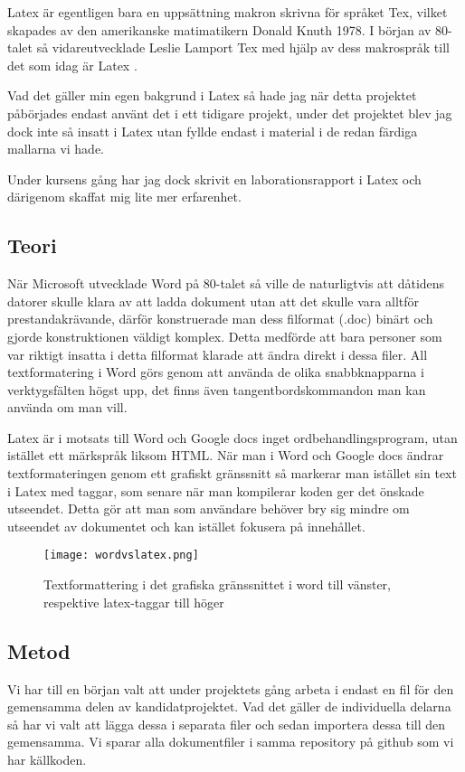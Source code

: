 Latex är egentligen bara en uppsättning makron skrivna för språket Tex, vilket skapades av den amerikanske matimatikern Donald Knuth 1978\cite{donald_knuth}. I början av 80-talet så vidareutvecklade Leslie Lamport Tex med hjälp av dess makrospråk till det som 
idag är Latex \cite{leslie_lamport}.

Vad det gäller min egen bakgrund i Latex så hade jag när detta projektet påbörjades endast använt det i ett tidigare projekt, under det projektet
blev jag dock inte så insatt i Latex utan fyllde endast i material i de redan färdiga mallarna vi hade.

Under kursens gång har jag dock skrivit en laborationsrapport i Latex och därigenom skaffat mig lite mer erfarenhet.


\subsection{Teori}
När Microsoft utvecklade Word på 80-talet så ville de naturligtvis att dåtidens datorer skulle klara av att ladda 
dokument utan att det skulle vara alltför prestandakrävande, därför konstruerade man dess filformat (.doc) binärt och gjorde konstruktionen 
väldigt komplex. Detta medförde att bara personer som var riktigt insatta i detta filformat klarade att ändra direkt i dessa filer.
All textformatering i Word görs genom att använda de olika snabbknapparna i verktygsfälten högst upp, det finns även tangentbordskommandon man kan
använda om man vill.

Latex är i motsats till Word och Google docs inget ordbehandlingsprogram, utan istället ett märkspråk liksom HTML. När man i Word och Google docs 
ändrar textformateringen genom ett grafiskt gränssnitt så markerar man istället sin text i Latex med taggar, som senare när man kompilerar koden ger
det önskade utseendet. Detta gör att man som användare behöver bry sig mindre om utseendet av dokumentet och kan istället fokusera på innehållet.


\begin{figure}[htbp]
\begin{center}
\texttt{[image: wordvslatex.png]}
\caption{Textformattering i det grafiska gränssnittet i word till vänster, respektive latex-taggar till höger}
\label{fig:msword}
\end{center}
\end{figure}


\subsection{Metod}
Vi har till en början valt att under projektets gång arbeta i endast en fil för den gemensamma delen av kandidatprojektet. Vad det gäller 
de individuella delarna så har vi valt att lägga dessa i separata filer och sedan importera dessa till den gemensamma. Vi 
sparar alla dokumentfiler i samma repository på github som vi har källkoden.

